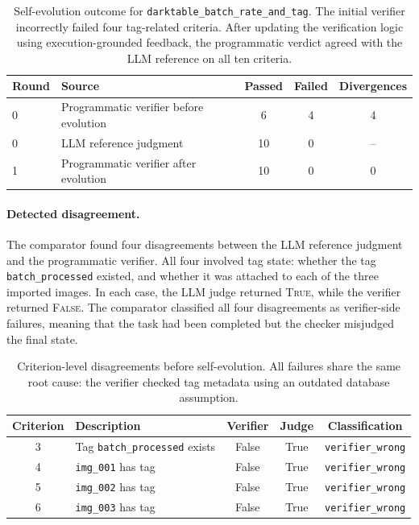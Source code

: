 \begin{table}[H]
\centering
\small
\begin{tabular}{llccc}
\toprule
Round & Source & Passed & Failed & Divergences \\
\midrule
0 & Programmatic verifier before evolution & 6 & 4 & 4 \\
0 & LLM reference judgment & 10 & 0 & -- \\
1 & Programmatic verifier after evolution & 10 & 0 & 0 \\
\bottomrule
\end{tabular}
\caption{
Self-evolution outcome for \texttt{darktable\_batch\_rate\_and\_tag}. The initial
verifier incorrectly failed four tag-related criteria. After updating the
verification logic using execution-grounded feedback, the programmatic verdict
agreed with the LLM reference on all ten criteria.
}
\label{tab:darktable-self-evolving-outcome}
\end{table}

\paragraph{Detected disagreement.}
The comparator found four disagreements between the LLM reference judgment and
the programmatic verifier. All four involved tag state: whether the tag
\texttt{batch\_processed} existed, and whether it was attached to each of the
three imported images. In each case, the LLM judge returned \textsc{True}, while
the verifier returned \textsc{False}. The comparator classified all four
disagreements as verifier-side failures, meaning that the task had been completed
but the checker misjudged the final state.

\begin{table}[H]
\centering
\small
\caption{
Criterion-level disagreements before self-evolution. All failures share the
same root cause: the verifier checked tag metadata using an outdated database
assumption.
}
\begin{tabular}{clccc}
\toprule
Criterion & Description & Verifier & Judge & Classification \\
\midrule
3 & Tag \texttt{batch\_processed} exists & False & True & \texttt{verifier\_wrong} \\
4 & \texttt{img\_001} has tag & False & True & \texttt{verifier\_wrong} \\
5 & \texttt{img\_002} has tag & False & True & \texttt{verifier\_wrong} \\
6 & \texttt{img\_003} has tag & False & True & \texttt{verifier\_wrong} \\
\bottomrule
\end{tabular}
\label{tab:darktable-self-evolving-disagreements}
\end{table}

